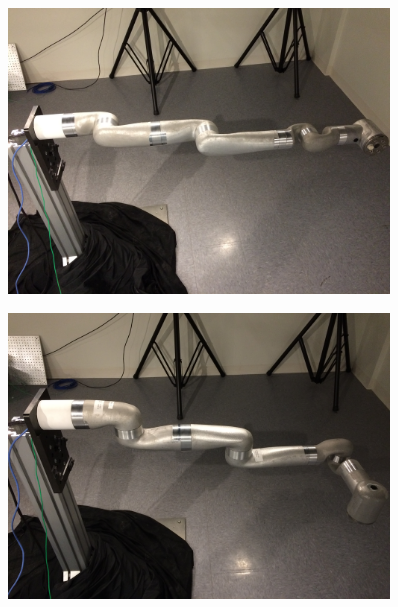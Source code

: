 \begin{figure}
	\centering
	\begin{minipage}{.5\textwidth}
		\centering
		\includegraphics[width=0.9\textwidth]{./images/Pose12}
		\label{fig:pose12}
	\end{minipage}%
	\begin{minipage}{.5\textwidth}
		\centering
		\includegraphics[width=0.9\textwidth]{./images/Pose13}
		\label{fig:pose13}
	\end{minipage}
\end{figure}

